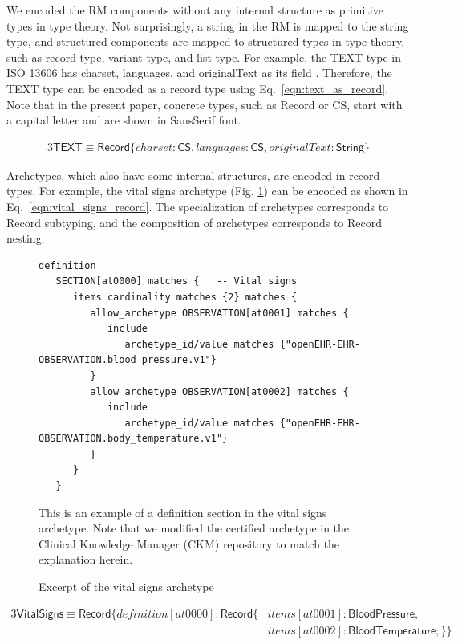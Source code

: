 \documentclass[preprint,3p,onecolumn,times,review]{elsarticle}
\begin{document}
We encoded the RM components without any internal structure as primitive types in type theory.
Not surprisingly, a string in the RM is mapped to the string type, and structured components are mapped to structured types in type theory, such as record type, variant type, and list type.
For example, the TEXT type in ISO 13606 has charset, languages, and originalText as its field \cite[p.36]{iso08:13606_healt_elect_part1}.
Therefore, the TEXT type can be encoded as a record type using Eq.~\ref{eqn:text_as_record}.
Note that in the present paper, concrete types, such as {\sf Record} or {\sf CS}, start with a capital letter and are shown in {\sf SansSerif} font.


\begin{alignat}{3}
  \mathsf{TEXT} \equiv \mathsf{Record}\{charset : \mathsf{CS}, languages : \mathsf{CS}, originalText : \mathsf{String} \}  \label{eqn:text_as_record}
\end{alignat}

Archetypes, which also have some internal structures, are encoded in record types.
For example, the vital signs archetype (Fig. \ref{fig:vital_signs_archetype}) can be encoded as shown in Eq.~\ref{eqn:vital_signs_record}.
The specialization of archetypes corresponds to Record subtyping, and the composition of archetypes corresponds to Record nesting.

\begin{figure}[!htbp]
\begin{verbatim}
definition
   SECTION[at0000] matches {   -- Vital signs
      items cardinality matches {2} matches {
         allow_archetype OBSERVATION[at0001] matches {
            include
               archetype_id/value matches {"openEHR-EHR-OBSERVATION.blood_pressure.v1"}
         }
         allow_archetype OBSERVATION[at0002] matches {
            include
               archetype_id/value matches {"openEHR-EHR-OBSERVATION.body_temperature.v1"}
         }
      }
   }
\end{verbatim}
  \caption{Excerpt of the vital signs archetype} \label{fig:vital_signs_archetype}
  This is an example of a definition section in the vital signs archetype.
  Note that we modified the certified archetype in the Clinical Knowledge Manager (CKM) repository to match the explanation herein.
\end{figure}


\begin{alignat}{3}
  \mathsf{VitalSigns} \equiv \mathsf{Record}\{definition[at0000] : \mathsf{Record}\{&items[at0001] : \mathsf{BloodPressure},\nonumber\\
                                                                              &items[at0002] : \mathsf{BloodTemperature;}\}\} \label{eqn:vital_signs_record}
\end{alignat}
\end{document}
